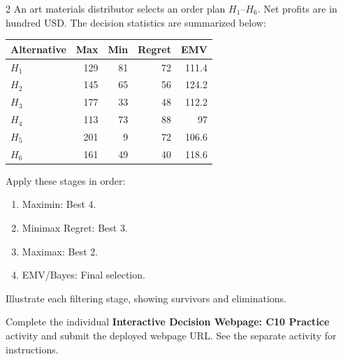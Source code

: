 \begin{multicols}{2}
\columnbreak
{}
An art materials distributor selects an order plan $H_1$--$H_6$. Net profits are in hundred USD. The decision statistics are summarized below:
\vspace{-3mm}
\begin{center}\small\setlength{\tabcolsep}{4pt}
	\begin{tabular}{lrrrr}\toprule
		Alternative & Max & Min & Regret & EMV\\ \midrule
		$H_1$ & 129 & 81 & 72 & 111.4\\
		$H_2$ & 145 & 65 & 56 & 124.2\\
		$H_3$ & 177 & 33 & 48 & 112.2\\
		$H_4$ & 113 & 73 & 88 & 97\\
		$H_5$ & 201 & 9 & 72 & 106.6\\
		$H_6$ & 161 & 49 & 40 & 118.6\\
		\bottomrule
	\end{tabular}
\end{center}
\vspace{-3mm}
Apply these stages in order:
\begin{enumerate}[leftmargin=*]
	\item Maximin: Best 4.
	\item Minimax Regret: Best 3.
	\item Maximax: Best 2.
	\item EMV/Bayes: Final selection.
\end{enumerate}
Illustrate each filtering stage, showing survivors and eliminations.

\par
{}
		Complete the individual \textbf{Interactive Decision Webpage: C10 Practice} activity and submit the deployed webpage URL. See the separate activity for instructions.
		
	\end{multicols}

